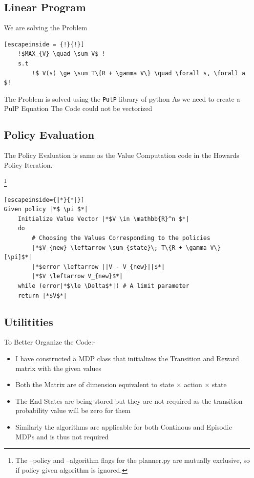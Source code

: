 \documentclass[10pt]{article}
\newcommand\blfootnote[1]{%
  \begingroup
  \renewcommand\thefootnote{}\footnote{#1}%
  \addtocounter{footnote}{-1}%
  \endgroup
}
\begin{document}
\subsection{Linear Program}
We are solving the Problem
\begin{lstlisting}[escapeinside = {!}{!}]
    !$MAX_{V} \quad \sum V$ !
    s.t     
        !$ V(s) \ge \sum T\{R + \gamma V\} \quad \forall s, \forall a $! 
\end{lstlisting}

The Problem is solved using the \verb|PulP| library of python 
As we need to create a PulP Equation The Code could not be vectorized 

\subsection{Policy Evaluation}
The Policy Evaluation is same as the Value Computation code in the Howards Policy Iteration.


\blfootnote{The --policy and --algorithm flags for the planner.py are mutually exclusive, so if policy given algorithm is ignored.}
\begin{lstlisting}[escapeinside={|*}{*|}]
Given policy |*$ \pi $*|
    Initialize Value Vector |*$V \in \mathbb{R}^n $*|
    do
        # Choosing the Values Corresponding to the policies
        |*$V_{new} \leftarrow \sum_{state}\; T\{R + \gamma V\} [\pi]$*|
        |*$error \leftarrow ||V - V_{new}||$*|
        |*$V \leftarrow V_{new}$*|
    while (error|*$\le \Delta$*|) # A limit parameter
    return |*$V$*| 
\end{lstlisting}

\subsection{Utilitities}
To Better Organize the Code:-

\begin{itemize}
    \item I have constructed a MDP class that initializes the Transition and Reward matrix with the given values
    \item Both the Matrix are of dimension equivalent to state $\times$ action $\times$ state
    \item The End States are being stored but they are not required as the transition probability value will be zero for them
    \item Similarly the algorithms are applicable for both Continous and Episodic MDPs and is thus not required 
\end{itemize}
\end{document}
